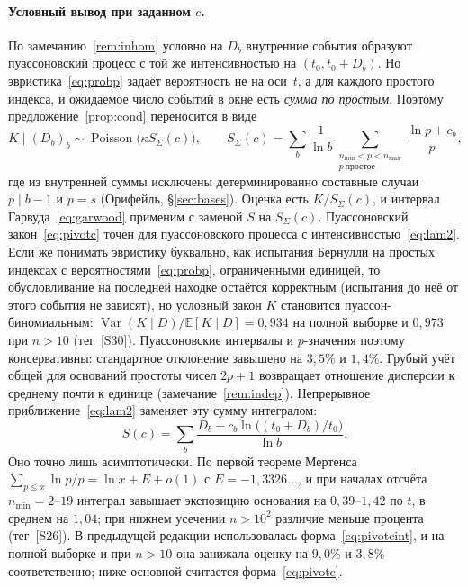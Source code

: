 \documentclass[11pt,a4paper]{article}
\theoremstyle{plain}
\theoremstyle{remark}
\DeclareMathOperator{\Pois}{Poisson}
\begin{document}
\paragraph{Условный вывод при заданном $c$.} По
замечанию~\ref{rem:inhom} условно на $D_b$ внутренние события образуют
пуассоновский процесс с той же интенсивностью на $(t_0,t_0+D_b)$. Но
эвристика~\eqref{eq:probp} задаёт вероятность не на оси~$t$, а для каждого простого
индекса, и ожидаемое число событий в окне есть \emph{сумма по простым}. Поэтому
предложение~\ref{prop:cond} переносится в виде
\begin{equation}\label{eq:pivotc}
K\mid(D_b)_b\sim\Pois\bigl(\kappa S_\Sigma(c)\bigr),\qquad
S_\Sigma(c)=\sum_b\frac{1}{\ln b}\sum_{\substack{n_{\min}<p<n_{\max}\\ p\ \text{простое}}}
\frac{\ln p+c_b}{p},
\end{equation}
где из внутренней суммы исключены детерминированно составные случаи $p\mid b-1$ и
$p=s$ (Орифейль, \S\ref{sec:bases}). Оценка есть $K/S_\Sigma(c)$, и интервал
Гарвуда~\eqref{eq:garwood} применим с заменой $S$ на $S_\Sigma(c)$. Пуассоновский
закон~\eqref{eq:pivotc} точен для пуассоновского процесса с
интенсивностью~\eqref{eq:lam2}. Если же понимать эвристику буквально, как испытания
Бернулли на простых индексах с вероятностями~\eqref{eq:probp}, ограниченными
единицей, то обусловливание на последней находке остаётся корректным (испытания до
неё от этого события не зависят), но условный закон $K$ становится
пуассон-биномиальным: $\operatorname{Var}(K\mid D)/\mathbb E[K\mid D]=0{,}934$ на
полной выборке и $0{,}973$ при $n>10$ (тег~[S30]). Пуассоновские интервалы и
$p$-значения поэтому консервативны: стандартное отклонение завышено на $3{,}5\%$ и
$1{,}4\%$. Грубый учёт общей для оснований простоты чисел $2p+1$ возвращает
отношение дисперсии к среднему почти к единице (замечание~\ref{rem:indep}).
Непрерывное приближение~\eqref{eq:lam2} заменяет эту сумму интегралом:
\begin{equation}\label{eq:pivotcint}
S(c)=\sum_b\frac{D_b+c_b\ln\bigl((t_0+D_b)/t_0\bigr)}{\ln b}.
\end{equation}
Оно точно лишь асимптотически. По первой теореме Мертенса
$\sum_{p\le x}\ln p/p=\ln x+E+o(1)$ с $E=-1{,}3326\ldots$, и при началах отсчёта
$n_{\min}=2$--$19$ интеграл завышает экспозицию основания на $0{,}39$--$1{,}42$ по
$t$, в среднем на $1{,}04$; при нижнем усечении $n>10^2$ различие меньше
процента (тег~[S26]). В предыдущей редакции использовалась
форма~\eqref{eq:pivotcint}, и на полной выборке и при $n>10$ она занижала оценку
на $9{,}0\%$ и $3{,}8\%$ соответственно; ниже основной считается
форма~\eqref{eq:pivotc}.
\end{document}
